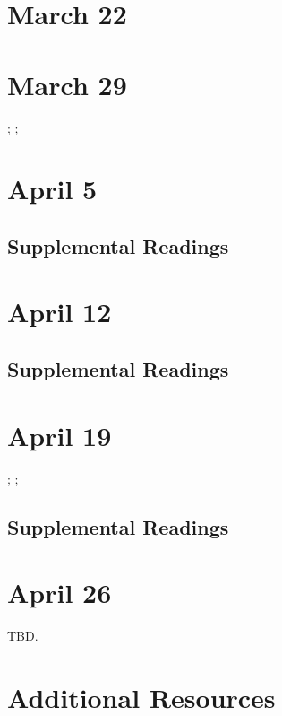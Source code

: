 \documentclass[11pt]{article}
\renewcommand{\cite}{\textcite}
\begin{document}
\section{March 22}


\section{March 29}

; ; 


\section{April 5 }


\subsection{Supplemental Readings}
\cite{Burrill2008}

\section{April 12}


\subsection{Supplemental Readings}


\section{April 19}

; ; 

\subsection{Supplemental Readings}
\cite{Ruberg:2017ww}

\section{April 26}

TBD.

\newpage
\section{Additional Resources}
\nocite{*} 
\printbibliography
\end{document}
